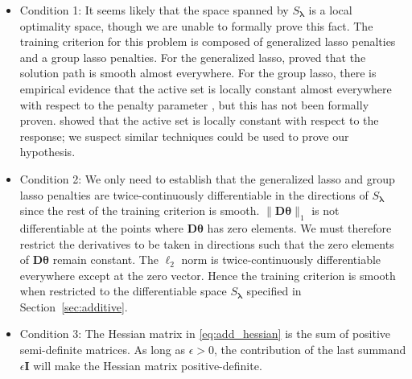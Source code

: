 \documentclass[12pt,letterpaper]{article}
\begin{document}
\begin{itemize}
	\item[] Condition 1: It seems likely that the space spanned by $S_{\boldsymbol{\lambda}}$ is a local optimality space, though we are unable to formally prove this fact. The training criterion for this problem is composed of generalized lasso penalties and a group lasso penalties. For the generalized lasso, \citet{tibshirani2011solution} proved that the solution path is smooth almost everywhere. For the group lasso, there is empirical evidence that the active set is locally constant almost everywhere with respect to the penalty parameter \citep{yuan2006model}, but this has not been formally proven. \citet{vaiter2012degrees} showed that the active set is locally constant with respect to the response; we suspect similar techniques could be used to prove our hypothesis.
	\item[] Condition 2:  We only need to establish that the generalized lasso and group lasso penalties are twice-continuously differentiable in the directions of $S_{\boldsymbol{\lambda}}$ since the rest of the training criterion is smooth. 
	$\| \boldsymbol{D} \boldsymbol{\theta} \|_1$ is not differentiable at the points where $\boldsymbol{D} \boldsymbol{\theta}$ has zero elements. We must therefore restrict the derivatives to be taken in directions such that the zero elements of $\boldsymbol{D} \boldsymbol{\theta}$ remain constant. The $\ell_2$ norm is twice-continuously differentiable everywhere except at the zero vector. Hence the training criterion is smooth when restricted to the differentiable space $S_{\boldsymbol{\lambda}}$ specified in Section~\ref{sec:additive}.
	\hfill {}
	\item[] Condition 3: The Hessian matrix in \eqref{eq:add_hessian} is the sum of positive semi-definite matrices. As long as $\epsilon > 0$, the contribution of the last summand $\epsilon \boldsymbol{I}$ will make the Hessian matrix positive-definite. \hfill {}
\end{itemize}
\end{document}
